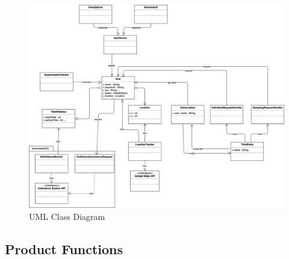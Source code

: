 \documentclass[12pt,a4paper]{article}
\begin{document}
		\begin{figure}[h]
			\includegraphics[width=1.25\linewidth]{Images/uml}
			\caption{UML Class Diagram}
			\label{fig:uml}
		\end{figure}
		
		
		\subsection{Product Functions}
		
\end{document}
